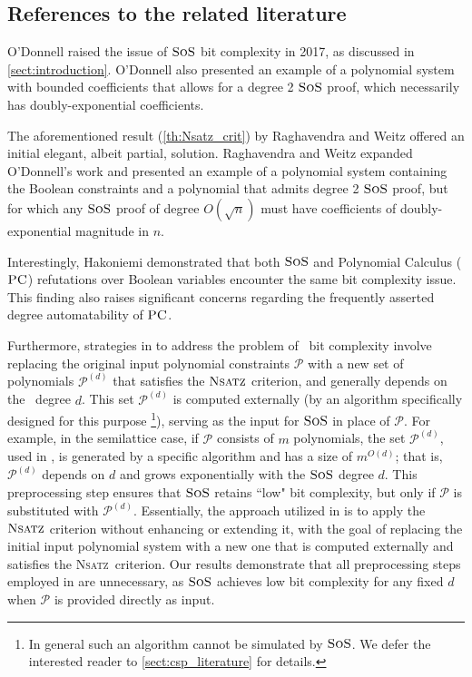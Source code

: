 \documentclass[11pt]{article}
\newcommand{\sos}{\text{\sc{SoS}}}
\newcommand{\PC}{\textsc{PC}}
\newcommand{\Nsatz}{\textsc{Nsatz}}
\newcommand{\1}{\textbf{1}}
\begin{document}
\subsection*{References to the related literature}\label{sect:previous_work}
O'Donnell \cite{odonnell2017} raised the issue of \(\sos\) bit complexity in 2017, as discussed in \cref{sect:introduction}. 
O'Donnell also presented an example of a polynomial system with bounded coefficients that allows for a degree 2 \(\sos\) proof, which necessarily has doubly-exponential coefficients.

The aforementioned result (\cref{th:Nsatz_crit}) by Raghavendra and Weitz \cite{raghavendra_weitz2017} offered an initial elegant, albeit partial, solution.
Raghavendra and Weitz expanded O'Donnell's work and presented an example of a polynomial system containing the Boolean constraints and a polynomial that admits degree 2 $\sos$ proof, but for which any $\sos$ proof of degree $O(\sqrt{n})$ must have coefficients of doubly-exponential magnitude in $n$.

Interestingly, Hakoniemi \cite{Hakoniemi21} demonstrated that both \(\sos\) and Polynomial Calculus ($\PC$)  refutations over Boolean variables encounter the same bit complexity issue. This finding also raises significant concerns regarding the frequently asserted degree automatability of \(\PC\).

Furthermore, strategies in \cite{BharathiM21,BulatovRSTOC22,BulatovARXIV21, Mastrolilli21TALG} to address the problem of \sos\ bit complexity involve replacing the original input polynomial constraints \(\mathcal{P}\) with a new set of polynomials $\mathcal{P}^{(d)}$ that satisfies the \(\Nsatz\) criterion, and generally depends on the \sos\ degree \(d\). This set $\mathcal{P}^{(d)}$ is computed externally (by an algorithm specifically designed for this purpose \footnote{In general such an algorithm cannot be simulated by $\sos$. We defer the interested reader to \cref{sect:csp_literature} for details.}), serving as the input for \(\sos\) in place of $\mathcal{P}$. For example, in the semilattice case, if $\mathcal{P}$ consists of $m$ polynomials, the set $\mathcal{P}^{(d)}$, used in \cite{BulatovRSTOC22,Mastrolilli21TALG}, is generated by a specific algorithm and has a size of \( m^{O(d)} \); that is, $\mathcal{P}^{(d)}$ depends on \( d \) and grows exponentially with the \(\sos\) degree \( d \). This preprocessing step ensures that \(\sos\) retains ``low" bit complexity, but only if $\mathcal{P}$ is substituted with $\mathcal{P}^{(d)}$. Essentially, the approach utilized in \cite{BharathiM21,BulatovRSTOC22,BulatovARXIV21, Mastrolilli21TALG} is to apply the \(\Nsatz\) criterion without enhancing or extending it, with the goal of replacing the initial input polynomial system with a new one that is computed externally and satisfies the \Nsatz\ criterion.
Our results demonstrate that all preprocessing steps employed in \cite{BharathiM21,BulatovRSTOC22,Mastrolilli21TALG} are unnecessary, as \(\sos\) achieves low bit complexity for any fixed \( d \) when \(\mathcal{P}\) is provided directly as input.
\end{document}
